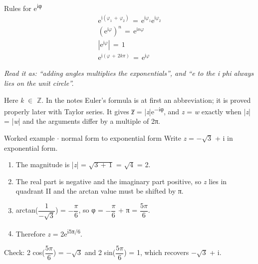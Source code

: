 \documentclass[11pt]{article}
\begin{document}
\begin{keepsection}
\begin{keepsection}
\begin{equationcard}{Rules for e\textsuperscript{iφ}}
\[ \begin{gathered} \mathrm{e}^{\mathrm{i}(φ_{1}\, +\, φ_{2})}\, =\, \mathrm{e}^{\mathrm{i}φ_{1}}\mathrm{e}^{\mathrm{i}φ_{2}} \\ (\mathrm{e}^{\mathrm{i}φ})^{{n}}\, =\, \mathrm{e}^{\mathrm{i}{n}φ} \\ |\mathrm{e}^{\mathrm{i}φ}|\, =\, 1 \\ \mathrm{e}^{\mathrm{i}(φ\, +\, 2{k}π)}\, =\, \mathrm{e}^{\mathrm{i}φ} \end{gathered} \]
{\small \emph{Read it as: “adding angles multiplies the exponentials”, and “e to the i phi always lies on the unit circle”.}\par Here \textit{k} \ensuremath{\in} \ensuremath{\mathbb{Z}}. In the notes Euler’s formula is at first an abbreviation; it is proved properly later with Taylor series. It gives \textit{z̅} = |\textit{z}|e\textsuperscript{\ensuremath{-}iφ}, and \textit{z} = \textit{w} exactly when |\textit{z}| = |\textit{w}| and the arguments differ by a multiple of 2π.}
\end{equationcard}

\begin{workedbox}{Worked example \ensuremath{\cdot} normal form to exponential form}
Write \textit{z} = \ensuremath{-}\ensuremath{\sqrt{3}} + i in exponential form.

\begin{enumerate}
\item The magnitude is |\textit{z}| = \ensuremath{\sqrt{3\, +\, 1}} = \ensuremath{\sqrt{4}} = 2.
\item The real part is negative and the imaginary part positive, so \textit{z} lies in quadrant II and the arctan value must be shifted by π.
\item arctan({\small\ensuremath{\dfrac{1}{-\sqrt{3}}}}) = \ensuremath{-}{\small\ensuremath{\dfrac{π}{6}}}, so φ = \ensuremath{-}{\small\ensuremath{\dfrac{π}{6}}} + π = {\small\ensuremath{\dfrac{5π}{6}}}.
\item Therefore \textit{z} = 2e\textsuperscript{i5π/6}.
\end{enumerate}

Check: 2 cos({\small\ensuremath{\dfrac{5π}{6}}}) = \ensuremath{-}\ensuremath{\sqrt{3}} and 2 sin({\small\ensuremath{\dfrac{5π}{6}}}) = 1, which recovers \ensuremath{-}\ensuremath{\sqrt{3}} + i.
\end{workedbox}
\end{keepsection}


\end{keepsection}
\end{document}
